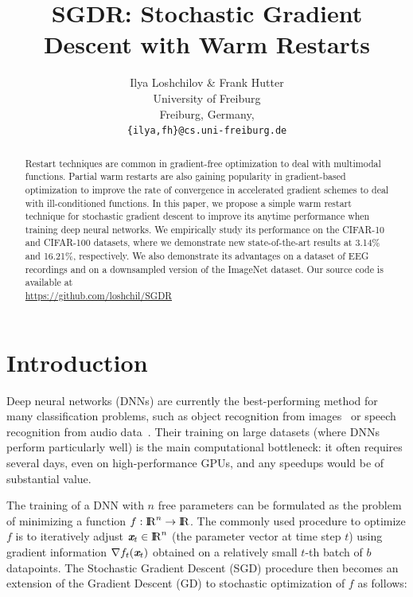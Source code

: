 \documentclass{article} %
\title{SGDR: Stochastic Gradient Descent with Warm Restarts}
\author{Ilya Loshchilov \& Frank Hutter \\
University of Freiburg\\
Freiburg, Germany, \\
\texttt{\{ilya,fh\}@cs.uni-freiburg.de} 
}
\def\R{{\rm I\hspace{-0.50ex}R}}
\newcommand{\vc}[1]{\textit{\textbf{#1}}}
\begin{document}
\maketitle

\begin{abstract}  
Restart techniques are common in gradient-free optimization to deal 
with multimodal functions. 
Partial warm restarts are also gaining popularity in gradient-based optimization 
to improve the rate of convergence in accelerated gradient schemes  
to deal with ill-conditioned functions.
In this paper, we propose a simple warm restart technique for stochastic gradient descent 
to improve its anytime performance when training deep neural networks. 
We empirically study its performance on the CIFAR-10 and CIFAR-100 datasets,   
where we demonstrate new state-of-the-art results at 3.14\% and 16.21\%, respectively. 
We also demonstrate its advantages on a dataset of EEG recordings and on a downsampled version of the ImageNet dataset.  
Our source code is available at \\ \url{https://github.com/loshchil/SGDR}
\end{abstract}


\section{Introduction}


Deep neural networks (DNNs) are currently the best-performing method for many classification problems, such
as object recognition from images~\citep{Krizhevsky2012,Donahue_ICML2014} or speech recognition
from audio data~\citep{Deng13newtypes}. Their training on large datasets (where DNNs perform particularly well) is the main  computational bottleneck: it often requires several days, even on high-performance GPUs, and any speedups would be of substantial value.

The training of a DNN with $n$ free parameters can be formulated as the problem of minimizing a function $f: \R^n \rightarrow \R$. The commonly used procedure to optimize $f$ is to iteratively adjust $\vc{x}_t \in \R^n$ (the parameter vector at time step $t$) using gradient information $\nabla f_t(\vc{x}_t)$ obtained on a relatively small $t$-th batch of $b$ datapoints. The Stochastic Gradient Descent (SGD) procedure then becomes an extension of the Gradient Descent (GD) to stochastic optimization of $f$ as follows:
\end{document}
